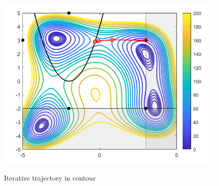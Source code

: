 \begin{figure}[H]
{\includegraphics[scale=0.4]{figures/IP_NLP_C.PNG}
}
\quad
{}
\quad
{}
\caption{ Iterative trajectory in contour}
\end{figure}

